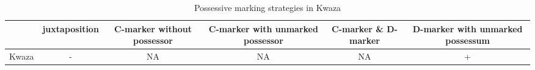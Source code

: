 \begin{table}[h!]
	\centering
	\small
	\begin{tabular}{@{}cccccc@{}}
		\toprule
		& juxtaposition & \parbox{2.5cm}{C-marker without possessor} & \parbox{2.75cm}{C-marker with unmarked possessor} & \parbox{1.75cm}{C-marker \& D-marker} & \parbox{3cm}{D-marker with unmarked possessum} \\ \midrule
		Kwaza & - & NA & NA & NA & + \\ \bottomrule
	\end{tabular}
	\caption{Possessive marking strategies in Kwaza}
\end{table}

\printglosses[style=mcolblock]

\printbibliography
 
